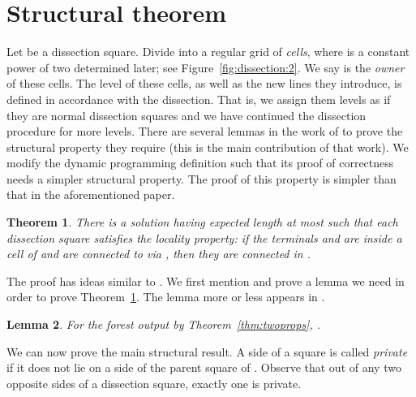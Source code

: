 \documentclass[extras,11pt]{article} \usepackage{fullpage}
\theoremstyle{mytheorem}
\newtheorem{theorem}{Theorem}
\newtheorem{lemma}[theorem]{Lemma}
\begin{document}
\section{Structural theorem}\label{sec:struct}
Let  be a dissection square.
Divide  into a regular  grid of \emph{cells}, where  is a constant power of two determined later; see Figure~\ref{fig:dissection:2}.
We say  is the \emph{owner} of these cells.
The level of these cells, as well as the new lines they introduce, is defined in accordance with the dissection.
That is, we assign them levels as if they are normal dissection squares and we have continued the dissection procedure for  more levels.
There are several lemmas in the work of \cite{BKM08:euc-for} to prove the structural property they require (this is the main contribution of that work).
We modify the dynamic programming definition such that its proof of correctness needs a simpler structural property.
The proof of this property is simpler than that in the aforementioned paper.
\begin{theorem}\label{thm:locality}
There is a solution  having expected length at most  such that each dissection square  satisfies the \emph{locality property}:
if the terminals  and  are inside a cell  of  and are connected to  via ,
 then they are connected in .
\end{theorem}
The proof has ideas similar to \cite[Theorem 3.2, and Lemmas 3.3, 3.4, 3.5 and 3.9]{BKM08:euc-for}.  We first mention and prove a lemma we need in order to prove Theorem~\ref{thm:locality}.
The lemma more or less appears in \cite{arora98:ptas,BKM08:euc-for}.
\begin{lemma}\label{lem:tot-int}
For the forest  output by Theorem~\ref{thm:twoprops},
.
\end{lemma}




We can now prove the main structural result.
A side  of a square  is called \emph{private} if it does not lie on a side of the parent square  of .
Observe that out of any two opposite sides of a dissection square, exactly one is private.
\end{document}
